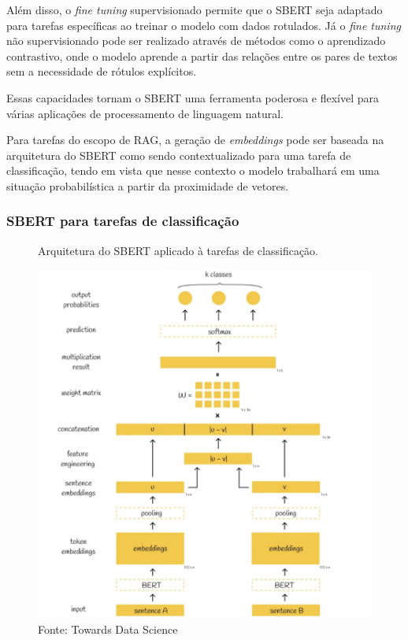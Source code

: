 Além disso, o \textit{fine tuning} supervisionado permite que o SBERT seja adaptado para tarefas específicas ao treinar o modelo com dados rotulados. Já o \textit{fine tuning} não supervisionado pode ser realizado através de métodos como o aprendizado contrastivo, onde o modelo aprende a partir das relações entre os pares de textos sem a necessidade de rótulos explícitos.

Essas capacidades tornam o SBERT uma ferramenta poderosa e flexível para várias aplicações de processamento de linguagem natural.

Para tarefas do escopo de RAG, a geração de \textit{embeddings} pode ser baseada na arquitetura do SBERT como sendo contextualizado para uma tarefa de classificação, tendo em vista que nesse contexto o modelo trabalhará em uma situação probabilística a partir da proximidade de vetores.

\subsubsection{SBERT para tarefas de classificação}
\label{softmax}
\begin{figure}[H]
    \centering
    \caption{Arquitetura do SBERT aplicado à tarefas de classificação.}
    \includegraphics[width=\linewidth]{img/BERT/bert7.png}
    \caption*{Fonte: Towards Data Science \cite{Vyacheslav2023}}
    \label{fig:bert7}
\end{figure}

